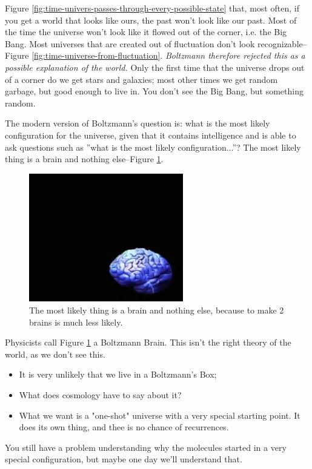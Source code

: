 \documentclass[]{article}
\begin{document}
Figure \ref{fig:time-univers-passes-through-every-possible-state} that, most often, if you get a world that looks like ours, the past won't look like our past. Most of the time the universe won't look like it flowed out of the corner, i.e. the Big Bang. Most universes that are created out of fluctuation don't look recognizable--Figure \ref{fig:time-universe-from-fluctuation}. \emph{Boltzmann therefore rejected this as a possible explanation of the world.} Only the first time that the universe drops out of a corner do we get stars and galaxies; most other times we get random garbage, but good enough to live in. You don't see the Big Bang, but something random.

The modern version of Boltzmann's question is: what is the most likely configuration for the universe, given that it contains intelligence and is able to ask questions such as ''what is the most likely configuration...''? The most likely thing is a brain and nothing else--Figure \ref{fig:t1ws-brain}.

\begin{figure}[H]
	\begin{center}
		\caption[The most likely thing is a brain and nothing else]{The most likely thing is a brain and nothing else, because to make 2 brains is much less likely.}\label{fig:t1ws-brain}
		\includegraphics[width=0.6\textwidth]{t1ws-brain}
	\end{center}
\end{figure}

Physicists call Figure \ref{fig:t1ws-brain} a Boltzmann Brain. This isn't the right theory of the world, as we don't see this.

\begin{itemize}
	\item It is very unlikely that we live in a Boltzmann's Box;
	\item What does cosmology have to say about it?
	\item What we want is a "one-shot" universe with a very special starting point. It does its own thing, and thee is no chance of recurrences.
\end{itemize}
You still have a problem understanding why the molecules started in a very special configuration, but maybe one day we'll understand that.
\end{document}
